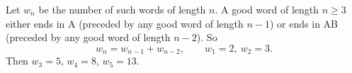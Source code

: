 Let $w_n$ be the number of such words of length $n$. A good word of length $n\ge3$ either ends in A (preceded by any good word of length $n-1$) or ends in AB (preceded by any good word of length $n-2$). So
\[
w_n=w_{n-1}+w_{n-2},\qquad w_1=2,\ w_2=3 .
\]
Then $w_3=5$, $w_4=8$, $w_5=\boxed{13}$.
